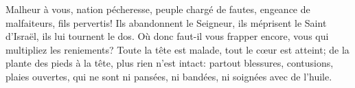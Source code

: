 Malheur à vous, nation pécheresse, peuple chargé de fautes,
	engeance de malfaiteurs, fils pervertis!
Ils abandonnent le Seigneur,
	ils méprisent le Saint d’Israël, ils lui tournent le dos.
Où donc faut-il vous frapper encore, vous qui multipliez les reniements?
	Toute la tête est malade, tout le cœur est atteint;
	de la plante des pieds à la tête, plus rien n’est intact:
	partout blessures, contusions, plaies ouvertes,
	qui ne sont ni pansées, ni bandées, ni soignées avec de l’huile.
